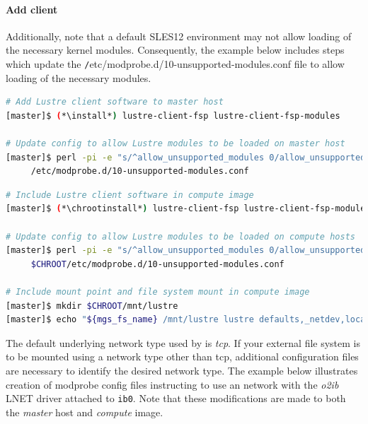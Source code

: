 \documentclass[letterpaper]{article}
\newcommand{\baseOS}{SLES12}
\newcommand{\install}{zypper -n install}
\newcommand{\chrootinstall}{zypper -n --root \$CHROOT install}
\begin{document}
\paragraph{Add \Lustre{} client} \label{sec:lustre_client}


Additionally, note that a default \baseOS{} environment may not allow loading of
the necessary \Lustre{} kernel modules. Consequently, the example below includes
steps which update the {\texttt /etc/modprobe.d/10-unsupported-modules.conf}
file to allow loading of the necessary modules.


\begin{lstlisting}[language=bash,keywords={},upquote=true]
# Add Lustre client software to master host
[master]$ (*\install*) lustre-client-fsp lustre-client-fsp-modules

# Update config to allow Lustre modules to be loaded on master host
[master]$ perl -pi -e "s/^allow_unsupported_modules 0/allow_unsupported_modules 1/" \
     /etc/modprobe.d/10-unsupported-modules.conf
\end{lstlisting}

\begin{lstlisting}[language=bash,keywords={},upquote=true]
# Include Lustre client software in compute image
[master]$ (*\chrootinstall*) lustre-client-fsp lustre-client-fsp-modules

# Update config to allow Lustre modules to be loaded on compute hosts
[master]$ perl -pi -e "s/^allow_unsupported_modules 0/allow_unsupported_modules 1/" \
     $CHROOT/etc/modprobe.d/10-unsupported-modules.conf

# Include mount point and file system mount in compute image
[master]$ mkdir $CHROOT/mnt/lustre
[master]$ echo "${mgs_fs_name} /mnt/lustre lustre defaults,_netdev,localflock 0 0" >> $CHROOT/etc/fstab
\end{lstlisting}



The default underlying network type used by \Lustre{} is {\em tcp}. If your
external \Lustre{} file system is to be mounted using a network type other than
tcp, additional configuration files are necessary to identify the desired
network type. The example below illustrates creation of modprobe config files
instructing \Lustre{} to use an \InfiniBand{} network with the {\em o2ib} LNET driver
attached to \texttt{ib0}. Note that these modifications are made to both the
{\em master} host and {\em compute} image.
\end{document}
